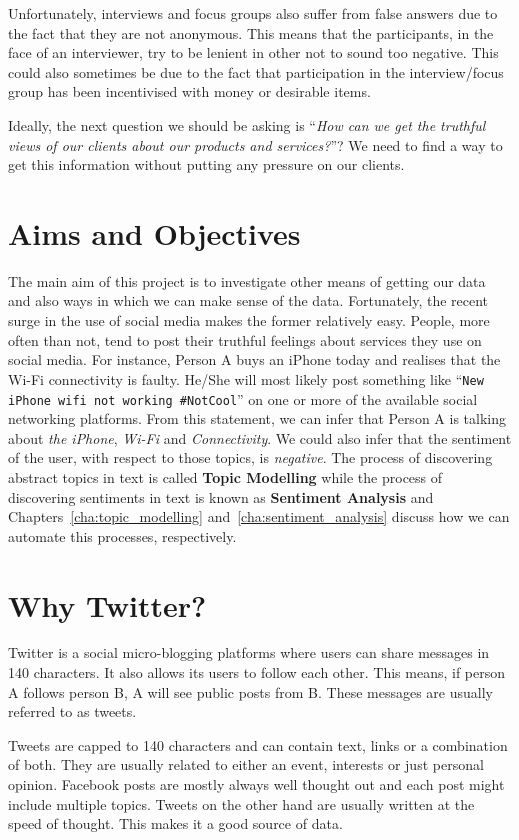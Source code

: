 Unfortunately, interviews and focus groups also suffer from false answers due to the fact that they
are not anonymous. This means that the participants, in the face of an interviewer, try to be
lenient in other not to sound too negative. This could also sometimes be due to the fact that
participation in the interview/focus group has been incentivised with money or desirable items.

Ideally, the next question we should be asking is ``\textit{How can we get the truthful views of our
clients about our products and services?}''? We need to find a way to get this information without
putting any pressure on our clients.

\section{Aims and Objectives}
\label{sec:objectives}
The main aim of this project is to investigate other means of getting our data and also ways in
which we can make sense of the data. Fortunately, the recent surge in the use of social media makes
the former relatively easy. People, more often than not, tend to post their truthful feelings about
services they use on social media. For instance, Person A buys an iPhone today and realises that the
Wi-Fi connectivity is faulty. He/She will most likely post something like ``\texttt{New iPhone wifi
not working \#NotCool}'' on one or more of the available social networking platforms. From this
statement, we can infer that Person A is talking about \textit{the iPhone}, \textit{Wi-Fi} and
\textit{Connectivity}. We could also infer that the sentiment of the user, with respect to those
topics, is \textit{negative}. The process of discovering abstract topics in text is called
\textbf{Topic Modelling} while the process of discovering sentiments in text is known as
\textbf{Sentiment Analysis} and Chapters~\ref{cha:topic_modelling} and~\ref{cha:sentiment_analysis}
discuss how we can automate this processes, respectively.

\section{Why Twitter?}
Twitter is a social micro-blogging platforms where users can share messages in 140 characters. It
also allows its users to follow each other. This means, if person A follows person B, A will see
public posts from B. These messages are usually referred to as tweets.

Tweets are capped to 140 characters and can contain text, links or a combination of both. They are
usually related to either an event, interests or just personal opinion. Facebook posts are mostly
always well thought out and each post might include multiple topics. Tweets on the other hand are
usually written at the speed of thought. This makes it a good source of data.

